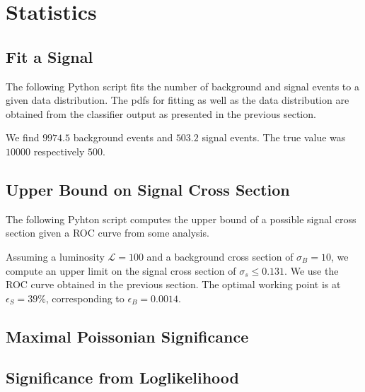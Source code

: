 
\section{Statistics}

\subsection{Fit a Signal}
The following Python script fits the number of background and signal
events to a given data distribution. The pdfs for fitting as well as
the data distribution are obtained from the classifier output as
presented in the previous section.
%
\begin{changemargin}{1.5cm}{1.5cm} 
  
\end{changemargin}
%
We find $9974.5$ background events and $503.2$ signal events. The true
value was $10000$ respectively $500$.

\subsection{Upper Bound on Signal Cross Section}
The following Pyhton script computes the upper bound of a possible
signal cross section given a ROC curve from some analysis.
%
\begin{changemargin}{1.5cm}{1.5cm} 
  
\end{changemargin}
%
Assuming a luminosity $\mathcal{L} = 100$ and a background cross
section of $\sigma_B = 10$, we compute an upper limit on the signal
cross section of $\sigma_s \le 0.131$. We use the ROC curve obtained
in the previous section. The optimal working point is at $\epsilon_S =
39\%$, corresponding to $\epsilon_B = 0.0014$.

\subsection{Maximal Poissonian Significance}


\subsection{Significance from Loglikelihood}
